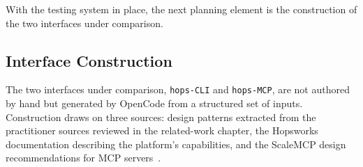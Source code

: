 \documentclass[
english,                 %
bibtex,                  %
includeExtraAbstracts, %
]{kththesis}
\numberwithin{listing}{chapter}
\begin{document}
\begin{table}[H]
    \centering
    \caption{Kaggle competitions selected from \gls{MLE}-bench, with the corresponding \gls{ML} task category and dataset size in \gls{GB}.}
    \label{tab:mle-bench-tasks}
\end{table}

With the testing system in place, the next planning element is the construction of the two interfaces under comparison.

\subsection{Interface Construction}

The two interfaces under comparison, \texttt{hops-\gls{CLI}} and \texttt{hops-\gls{MCP}}, are not authored by hand but generated by OpenCode from a structured set of inputs. Construction draws on three sources: design patterns extracted from the practitioner sources reviewed in the related-work chapter, the Hopsworks documentation describing the platform's capabilities, and the Scale\gls{MCP} design recommendations for \gls{MCP} servers~\cite{marcelloni_scalemcp_2026}.
\end{document}
